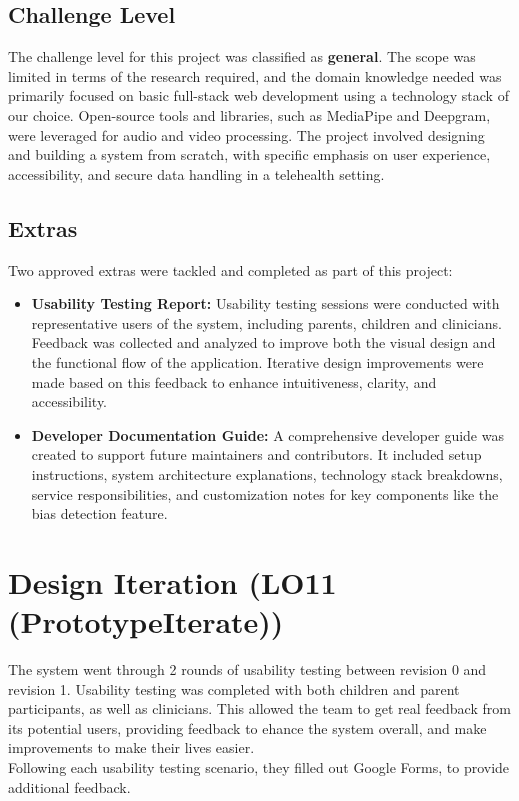 \documentclass{article}
\begin{document}
\subsection{Challenge Level}

\hspace{2em}The challenge level for this project was classified as \textbf{general}. The scope was limited in terms of the research required, and the domain knowledge needed was primarily focused on basic full-stack web development using a technology stack of our choice. 
Open-source tools and libraries, such as MediaPipe and Deepgram, were leveraged for audio and video processing. The project involved designing and building a system from scratch, with specific emphasis on user experience, accessibility, and secure data handling in a telehealth setting.

\subsection{Extras}

Two approved extras were tackled and completed as part of this project:

\begin{itemize}
    \item \textbf{Usability Testing Report:} Usability testing sessions were conducted with representative users of the system, including parents, children and clinicians. 
    Feedback was collected and analyzed to improve both the visual design and the functional flow of the application. Iterative design improvements were made based on this feedback to enhance intuitiveness, clarity, and accessibility.
    
    \item \textbf{Developer Documentation Guide:} A comprehensive developer guide was created to support future maintainers and contributors. 
    It included setup instructions, system architecture explanations, technology stack breakdowns, service responsibilities, and customization notes for key components like the bias detection feature.
\end{itemize}

\newpage

\section{Design Iteration (LO11 (PrototypeIterate))}

\hspace{2em} The system went through 2 rounds of usability testing between revision 0 and revision 1. Usability testing was completed with both children and parent participants, as well as clinicians.
This allowed the team to get real feedback from its potential users, providing feedback to ehance the system overall, and make improvements to make their lives easier.\\
Following each usability testing scenario, they filled out Google Forms, to provide additional feedback.
\end{document}
